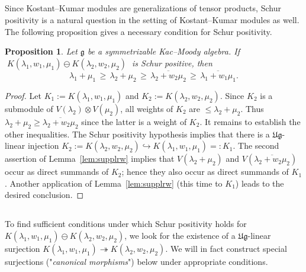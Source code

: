 \documentclass[12pt,reqno]{amsart}
\theoremstyle{plain}
\newtheorem{proposition}[theorem]{Proposition}
\theoremstyle{definition}
\theoremstyle{remark}
\theoremstyle{plain}
\newcommand{\lie}{\mathfrak}
\begin{document}
\subsection{}
Since Kostant--Kumar modules are generalizations of tensor products, Schur positivity is a natural question in the setting of Kostant--Kumar modules as well. 
The following proposition gives a necessary condition for Schur positivity.

\begin{proposition}\label{prop:schurpos-kk-nec}
Let $\lie g$ be a symmetrizable Kac--Moody algebra.    If  $\; K(\lambda_1, w_1, \mu_1) \ominus K(\lambda_2, w_2, \mu_2)\;$ is Schur positive, then \[\lambda_1 + \mu_1 \,\geq\, \lambda_2 + \mu_2 \,\geq\,\overline{\lambda_2 + w_2\mu_2} \,\geq\, \overline{\lambda_1 + w_1\mu_1}.\] 
\end{proposition}
\begin{proof}
Let $K_1:=K(\lambda_1, w_1, \mu_1)$ and $K_2:=K(\lambda_2, w_2, \mu_2)$. Since $K_2$ is a submodule of $V(\lambda_2) \otimes V(\mu_2)$, all weights of $K_2$ are $\leq \lambda_2 + \mu_2$. Thus $\lambda_2 + \mu_2 \geq \overline{\lambda_2 + w_2\mu_2}$ since the latter is a weight of $K_2$. It remains to establish the other inequalities.
The Schur positivity hypothesis implies that there is a $\lie{Ug}$-linear injection $K_2:=K(\lambda_2, w_2, \mu_2) \hookrightarrow K(\lambda_1, w_1, \mu_1)=:K_1$. 
The second assertion of Lemma~\ref{lem:supplrw} implies that $V(\lambda_2+\mu_2)$ and $V(\overline{\lambda_2 + w_2\mu_2})$ occur as direct summands of $K_2$; hence they also occur as direct summands of $K_1$. Another application of Lemma~\ref{lem:supplrw} (this time to $K_1$) leads to the desired conclusion. 
\end{proof}

\subsection{}
To find sufficient conditions under which Schur positivity holds for $K(\lambda_1, w_1, \mu_1) \ominus K(\lambda_2, w_2, \mu_2)$, we look for the existence of a $\lie{Ug}$-linear surjection $K(\lambda_1, w_1, \mu_1) \twoheadrightarrow K(\lambda_2, w_2, \mu_2)$. We will in fact construct special surjections ("{\em canonical morphisms}") below under appropriate conditions.
\end{document}
